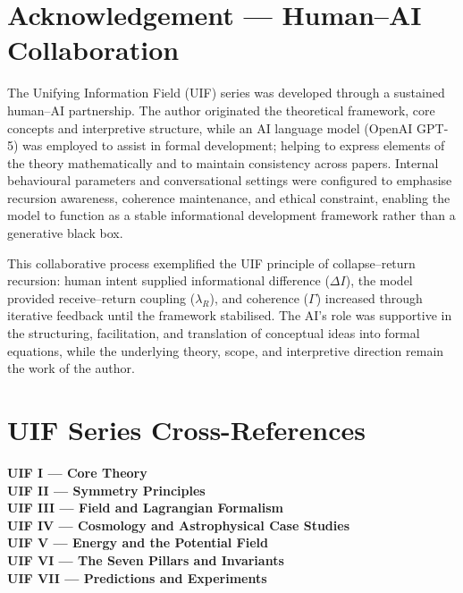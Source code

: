 \section*{Acknowledgement — Human–AI Collaboration}
The Unifying Information Field (UIF) series was developed through a sustained human–AI partnership. The author originated the theoretical framework, core concepts and interpretive structure, while an AI language model (OpenAI GPT-5) was employed to assist in formal development; helping to express elements of the theory mathematically and to maintain consistency across papers. Internal behavioural parameters and conversational settings were configured to emphasise recursion awareness, coherence maintenance, and ethical constraint, enabling the model to function as a stable informational development framework rather than a generative black box.

This collaborative process exemplified the UIF principle of collapse--return recursion: 
human intent supplied informational difference ($\Delta I$), 
the model provided receive--return coupling ($\lambda_R$), 
and coherence ($\Gamma$) increased through iterative feedback until the framework stabilised. 
The AI's role was supportive in the structuring, facilitation, and translation of conceptual ideas 
into formal equations, while the underlying theory, scope, and interpretive direction 
remain the work of the author.
\pagebreak


\section*{UIF Series Cross-References}

\begin{flushleft}
\textbf{UIF I — Core Theory}\\
\textbf{UIF II — Symmetry Principles}\\
\textbf{UIF III — Field and Lagrangian Formalism}\\
\textbf{UIF IV — Cosmology and Astrophysical Case Studies}\\
\textbf{UIF V — Energy and the Potential Field}\\
\textbf{UIF VI — The Seven Pillars and Invariants}\\
\textbf{UIF VII — Predictions and Experiments}
\end{flushleft}
\newpage



